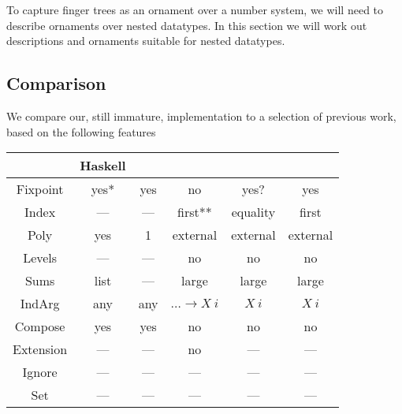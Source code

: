 To capture finger trees as an ornament over a number system, we will need to describe ornaments over nested datatypes. In this section we will work out descriptions and ornaments suitable for nested datatypes.

\subsection{Comparison}
We compare our, still immature, implementation to a selection of previous work, based on the following features


\begin{tabular}{c | c c c c c}
             & Haskell        & \cite{initenough} & \cite{levitation} & \cite{algorn} & \cite{progorn} \\
    \hline                                                                                             
    Fixpoint & yes*           & yes               & no                & yes?          & yes            \\
    Index    & —              & —                 & first**           & equality      & first          \\
    Poly     & yes            & 1                 & external          & external      & external       \\
    Levels   & —              & —                 & no                & no            & no             \\
    Sums     & list           & —                 & large             & large         & large          \\
    IndArg   & any            & any               & $\dots \to X\ i$  & $X\ i$        & $X\ i$         \\
    Compose  & yes            & yes               & no                & no            & no             \\
    Extension& —              & —                 & no                & —             & —              \\
    Ignore   & —              & —                 & —                 & —             & —              \\
    Set      & —              & —                 & —                 & —             & —              \\
\end{tabular}



